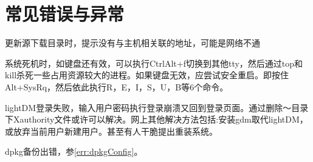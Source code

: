 \section{常见错误与异常}

更新源下载目录时，提示没有与主机相关联的地址，可能是网络不通

系统死机时，如键盘还有效，可以执行CtrlAlt+f切换到其他tty，然后通过top和kill杀死一些占用资源较大的进程。如果键盘无效，应尝试安全重启。即按住Alt+SysRq，然后依此执行R，E，I，S，U，B等6个命令。

lightDM登录失败，输入用户密码执行登录崩溃又回到登录页面。通过删除～目录下Xauthority文件或许可以解决。网上其他解决方法包括:安装gdm取代lightDM，或放弃当前用户新建用户。甚至有人干脆提出重装系统。


dpkg备份出错，参\ref{err:dpkgConfig}。


